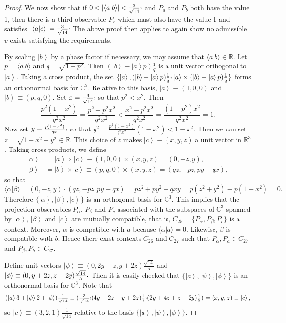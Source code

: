 \documentclass[%
 preprint,
 showpacs,
 showkeys,
 amsmath,
 amssymb,
 aps,
 pra,
 ]{revtex4-1}
\theoremstyle{definition}
\newcommand{\ket}[1]{\left| #1 \right>}
\newcommand{\iprod}[2]{\langle #1 | #2 \rangle}
\begin{document}
\begin{proof}
	We now show that if $0<|\iprod{a}{b}|<\frac{3}{\sqrt{14}}\raisebox{.8mm}{,}$ and $P_a$ and $P_b$ both have the value 1, then there is a third observable $P_c$ which must also have the value 1 and satisfies $|\iprod{a}{c}|=\frac{3}{\sqrt{14}}\raisebox{.8mm}{.}$
	The above proof then applies to again show no admissible $v$ exists satisfying the requirements.
	
	By scaling $\ket{b}$ by a phase factor if necessary, we may assume that $\iprod{a}{b} \in \mathbb{R}$.
	Let $p = \iprod{a}{b}$ and $q = \sqrt{1 - p^2}$.
	Then $(\ket{b} - \ket{a} p) \frac{1}{q}$ is a unit vector orthogonal to $\ket{a}$.
	Taking a cross product, the set $\{ \ket{a}, (\ket{b} - \ket{a} p) \frac{1}{q}\raisebox{.8mm}{,} \ket{a} \times (\ket{b} - \ket{a} p) \frac{1}{q} \}$ forms an orthonormal basis for $\mathbb{C}^3$.
	Relative to this basis, $\ket{a} \equiv (1, 0, 0)$ and $\ket{b} \equiv (p, q, 0)$.
	Set $x = \frac{3}{\sqrt{14}}\raisebox{.8mm}{,}$ so that $p^2 < x^2$.
	Then $$\frac{p^2 (1 - x^2)}{q^2 x^2} = \frac{p^2 - p^2 x^2}{q^2 x^2} < \frac{x^2 - p^2 x^2}{q^2 x^2} = \frac{(1 - p^2) x^2}{q^2 x^2} = 1.$$
	Now set $y = \frac{p (1 - x^2)}{q x}\raisebox{.7mm}{,}$ so that $y^2 = \frac{p^2 (1 - x^2)}{q^2 x^2} (1 - x^2) < 1 - x^2$.
	Then we can set $z = \sqrt{1 - x^2 - y^2} \in \mathbb{R}$.
	This choice of $z$ makes $\ket{c} \equiv (x, y, z)$ a unit vector in $\mathbb{R}^3$.
	Taking cross products, we define
	\begin{align*}
		\ket{\alpha} &= \ket{a} \times \ket{c} \equiv (1, 0, 0) \times (x, y, z) = (0, -z, y), \\
		\ket{\beta} &= \ket{b} \times \ket{c} \equiv (p, q, 0) \times (x, y, z) = (q z, -p z, p y - q x),
	\end{align*}
	so that $\iprod{\alpha}{\beta} = (0, -z, y) \cdot (q z, -p z, p y - q x) = p z^2 + p y^2 - q x y = p (z^2 + y^2) - p (1 - x^2) = 0.$
	Therefore $\{ \ket{\alpha}, \ket{\beta}, \ket{c} \}$ is an orthogonal basis for $\mathbb{C}^3$.
	This implies that the projection observables $P_\alpha$, $P_\beta$ and $P_c$ associated with the subspaces of $\mathbb{C}^3$ spanned by $\ket{\alpha}$, $\ket{\beta}$ and $\ket{c}$ are mutually compatible, that is,  $C_{25} = \{ P_\alpha, P_\beta, P_c \}$ is a context.
	Moreover, $\alpha$ is compatible with $a$ because $\iprod{\alpha}{a} = 0$.
	Likewise, $\beta$ is compatible with $b$.
	Hence there exist contexts $C_{26}$ and $C_{27}$ such that $P_\alpha, P_a \in C_{27}$ and $P_\beta, P_b \in C_{27}$.

	Define unit vectors $\ket{\psi} \equiv (0, 2 y - z, y + 2 z) \frac{\sqrt{14}}{5}$ and $\ket{\phi} \equiv (0, y + 2 z, z - 2 y) \frac{\sqrt{14}}{5}\raisebox{.4mm}{.}$
	Then it is easily checked that $\{ \ket{a}, \ket{\psi}, \ket{\phi} \}$ is an orthonormal basis for $\mathbb{C}^3$.
	Note that
	$$(\ket{a} 3 + \ket{\psi} 2 + \ket{\phi}) \tfrac{1}{\sqrt{14}} \equiv (\tfrac{3}{\sqrt{14}}\raisebox{.8mm}{,} (4 y - 2 z + y + 2 z) \tfrac{1}{5}\raisebox{.8mm}{,} (2 y + 4 z + z - 2 y) \tfrac{1}{5}) = (x, y, z) \equiv \ket{c},$$
	 so $\ket{c} \equiv (3, 2, 1) \frac{1}{\sqrt{14}}$ relative to the basis $\{ \ket{a}, \ket{\psi}, \ket{\phi} \}$.
	

\end{proof}
\end{document}
